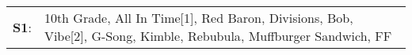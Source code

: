 \begin{supertabular}{p{0.03\textwidth}p{0.92\textwidth}}
 \textbf{S1}:  &  10th Grade\textsuperscript{}, \enspace All In Time[1]\textsuperscript{}, \enspace Red Baron\textsuperscript{}, \enspace Divisions\textsuperscript{}, \enspace Bob\textsuperscript{}, \enspace Vibe[2]\textsuperscript{}, \enspace G-Song\textsuperscript{}, \enspace Kimble\textsuperscript{}, \enspace Rebubula\textsuperscript{}, \enspace Muffburger Sandwich\textsuperscript{}, \enspace FF\textsuperscript{}  \enspace  \\
\end{supertabular}
